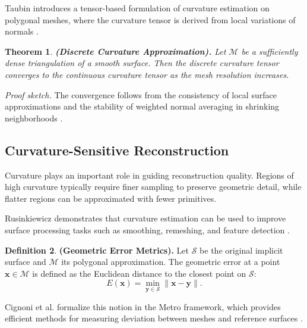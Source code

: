 \documentclass[12pt, a4paper, oneside]{book}
\theoremstyle{plain}
\newtheorem{theorem}{Theorem}[chapter]
\theoremstyle{definition}
\newtheorem{definition}[theorem]{Definition}
\theoremstyle{remark}
\theoremstyle{definition}
\begin{document}
Taubin introduces a tensor-based formulation of curvature estimation on polygonal meshes, where the curvature tensor is derived from local variations of normals \cite{taubin1995estimating}.

\begin{theorem}
    \textbf{ (Discrete Curvature Approximation).}
Let $\mathcal{M}$ be a sufficiently dense triangulation of a smooth surface. Then the discrete curvature tensor converges to the continuous curvature tensor as the mesh resolution increases.
\end{theorem}

\textit{Proof sketch.} The convergence follows from the consistency of local surface approximations and the stability of weighted normal averaging in shrinking neighborhoods \cite{taubin1995estimating}.

\vspace{0.5em}

\subsection{Curvature-Sensitive Reconstruction}

Curvature plays an important role in guiding reconstruction quality. Regions of high curvature typically require finer sampling to preserve geometric detail, while flatter regions can be approximated with fewer primitives.

Rusinkiewicz demonstrates that curvature estimation can be used to improve surface processing tasks such as smoothing, remeshing, and feature detection \cite{rusinkiewicz2004estimating}.

\vspace{0.5em}

\begin{definition}
    \textbf{ (Geometric Error Metrics).}
Let $\mathcal{S}$ be the original implicit surface and $\mathcal{M}$ its polygonal approximation. The geometric error at a point $\mathbf{x} \in \mathcal{M}$ is defined as the Euclidean distance to the closest point on $\mathcal{S}$:
\[
E(\mathbf{x}) = \min_{\mathbf{y} \in \mathcal{S}} \|\mathbf{x} - \mathbf{y}\|.
\]
\end{definition}

Cignoni et al. formalize this notion in the Metro framework, which provides efficient methods for measuring deviation between meshes and reference surfaces \cite{cignoni1998metro}.

\vspace{0.5em}
\end{document}
